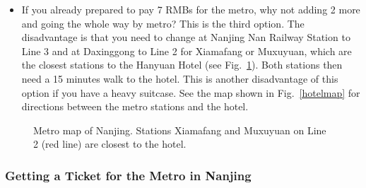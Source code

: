 \documentclass[11pt]{report}
\begin{document}
\begin{itemize}
\item If you already prepared to pay 7 RMBs for the metro, why
      not adding 2 more and going the whole way by metro? 
      This is the third
      option. The disadvantage is that you need to change
      at Nanjing Nan Railway Station to Line 3 and at 
      Daxinggong to Line 2 for Xiamafang or Muxuyuan, which
      are the closest stations to the Hanyuan Hotel 
      (see Fig.~\ref{metronanjing}). Both
      stations then need a 15 minutes walk to the hotel.
      This is another disadvantage of this option if you have 
      a heavy suitcase. See the map shown in Fig.~\ref{hotelmap}
      for directions between the metro stations and the
      hotel.
 \end{itemize}

\begin{figure}[p]
\begin{center}
\end{center}
\caption{Metro map of Nanjing. Stations
Xiamafang and Muxuyuan on Line 2 (red line) are 
closest to the hotel.\label{metronanjing}} 
\end{figure}

\subsubsection*{Getting a Ticket for the Metro in Nanjing}
\end{document}
